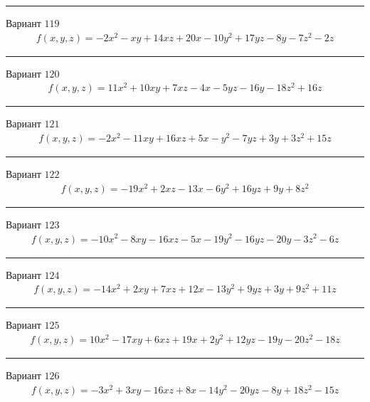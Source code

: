 \documentclass[11pt]{report}
\begin{document}
\begin{center}
\noindent\rule{8cm}{0.4pt}
\end{center}
Вариант $119$
\begin{align*}
    f(x, y, z) = - 2 x^{2} - x y + 14 x z + 20 x - 10 y^{2} + 17 y z - 8 y - 7 z^{2} - 2 z
\end{align*}
\begin{center}
\noindent\rule{8cm}{0.4pt}
\end{center}
Вариант $120$
\begin{align*}
    f(x, y, z) = 11 x^{2} + 10 x y + 7 x z - 4 x - 5 y z - 16 y - 18 z^{2} + 16 z
\end{align*}
\begin{center}
\noindent\rule{8cm}{0.4pt}
\end{center}
Вариант $121$
\begin{align*}
    f(x, y, z) = - 2 x^{2} - 11 x y + 16 x z + 5 x - y^{2} - 7 y z + 3 y + 3 z^{2} + 15 z
\end{align*}
\begin{center}
\noindent\rule{8cm}{0.4pt}
\end{center}
Вариант $122$
\begin{align*}
    f(x, y, z) = - 19 x^{2} + 2 x z - 13 x - 6 y^{2} + 16 y z + 9 y + 8 z^{2}
\end{align*}
\begin{center}
\noindent\rule{8cm}{0.4pt}
\end{center}
Вариант $123$
\begin{align*}
    f(x, y, z) = - 10 x^{2} - 8 x y - 16 x z - 5 x - 19 y^{2} - 16 y z - 20 y - 3 z^{2} - 6 z
\end{align*}
\begin{center}
\noindent\rule{8cm}{0.4pt}
\end{center}
Вариант $124$
\begin{align*}
    f(x, y, z) = - 14 x^{2} + 2 x y + 7 x z + 12 x - 13 y^{2} + 9 y z + 3 y + 9 z^{2} + 11 z
\end{align*}
\begin{center}
\noindent\rule{8cm}{0.4pt}
\end{center}
Вариант $125$
\begin{align*}
    f(x, y, z) = 10 x^{2} - 17 x y + 6 x z + 19 x + 2 y^{2} + 12 y z - 19 y - 20 z^{2} - 18 z
\end{align*}
\begin{center}
\noindent\rule{8cm}{0.4pt}
\end{center}
Вариант $126$
\begin{align*}
    f(x, y, z) = - 3 x^{2} + 3 x y - 16 x z + 8 x - 14 y^{2} - 20 y z - 8 y + 18 z^{2} - 15 z
\end{align*}
\end{document}
